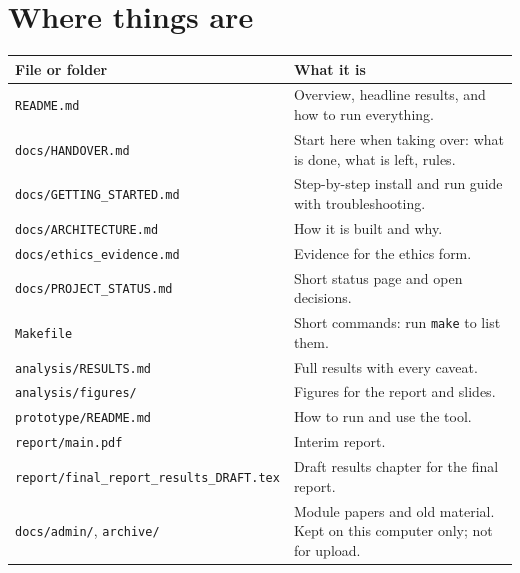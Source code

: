 \documentclass[11pt,a4paper]{article}
\newcommand{\file}[1]{\texttt{\small #1}}
\begin{document}
\section{Where things are}
\begin{tabularx}{\linewidth}{@{}P{7cm}L@{}}
\toprule
\textbf{File or folder} & \textbf{What it is} \\
\midrule
\file{README.md} & Overview, headline results, and how to run everything. \\
\file{docs/HANDOVER.md} & Start here when taking over: what is done, what is left, rules. \\
\file{docs/GETTING\_STARTED.md} & Step-by-step install and run guide with troubleshooting. \\
\file{docs/ARCHITECTURE.md} & How it is built and why. \\
\file{docs/ethics\_evidence.md} & Evidence for the ethics form. \\
\file{docs/PROJECT\_STATUS.md} & Short status page and open decisions. \\
\file{Makefile} & Short commands: run \texttt{make} to list them. \\
\file{analysis/RESULTS.md} & Full results with every caveat. \\
\file{analysis/figures/} & Figures for the report and slides. \\
\file{prototype/README.md} & How to run and use the tool. \\
\file{report/main.pdf} & Interim report. \\
\file{report/final\_report\_results\_DRAFT.tex} & Draft results chapter for the final report. \\
\file{docs/admin/}, \file{archive/} & Module papers and old material. Kept on this computer only; not for upload. \\
\bottomrule
\end{tabularx}
\end{document}
